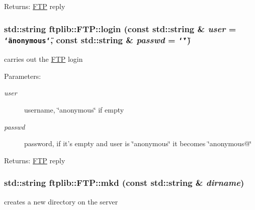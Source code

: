 \begin{Desc}
\item[Returns:]\hyperlink{classftplib_1_1FTP}{FTP} reply \end{Desc}
\hypertarget{classftplib_1_1FTP_dc39751d00808d35183fb19c483b3589}{
\subsubsection[{login}]{\setlength{\rightskip}{0pt plus 5cm}std::string ftplib::FTP::login (const std::string \& {\em user} = {\tt \char`\"{}anonymous\char`\"{}}, \/  const std::string \& {\em passwd} = {\tt \char`\"{}\char`\"{}})}}
\label{classftplib_1_1FTP_dc39751d00808d35183fb19c483b3589}


carries out the \hyperlink{classftplib_1_1FTP}{FTP} login 

\begin{Desc}
\item[Parameters:]
\begin{description}
\item[{\em user}]username, \char`\"{}anonymous\char`\"{} if empty \item[{\em passwd}]password, if it's empty and user is \char`\"{}anonymous\char`\"{} it becomes \char`\"{}anonymous@\char`\"{} \end{description}
\end{Desc}
\begin{Desc}
\item[Returns:]\hyperlink{classftplib_1_1FTP}{FTP} reply \end{Desc}
\hypertarget{classftplib_1_1FTP_05c4b118a0e278e70c79c1c42484f669}{
\subsubsection[{mkd}]{\setlength{\rightskip}{0pt plus 5cm}std::string ftplib::FTP::mkd (const std::string \& {\em dirname})}}
\label{classftplib_1_1FTP_05c4b118a0e278e70c79c1c42484f669}


creates a new directory on the server 

